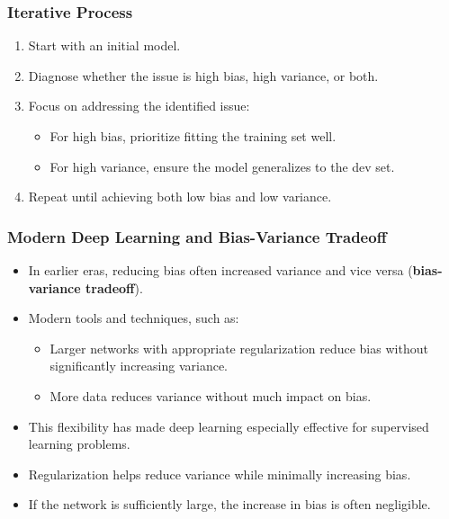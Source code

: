 \documentclass[letterpaper,12pt,notitlepage,twoside]{report}
\begin{document}
\subsubsection{Iterative Process}
\begin{enumerate}
    \item Start with an initial model.
    \item Diagnose whether the issue is high bias, high variance, or both.
    \item Focus on addressing the identified issue:
    \begin{itemize}
        \item For high bias, prioritize fitting the training set well.
        \item For high variance, ensure the model generalizes to the dev set.
    \end{itemize}
    \item Repeat until achieving both low bias and low variance.
\end{enumerate}

\subsubsection{Modern Deep Learning and Bias-Variance Tradeoff}
\begin{itemize}
    \item In earlier eras, reducing bias often increased variance and vice versa (\textbf{bias-variance tradeoff}).
    \item Modern tools and techniques, such as:
    \begin{itemize}
        \item Larger networks with appropriate regularization reduce bias without significantly increasing variance.
        \item More data reduces variance without much impact on bias.
    \end{itemize}
    \item This flexibility has made deep learning especially effective for supervised learning problems.
    \item Regularization helps reduce variance while minimally increasing bias.
    \item If the network is sufficiently large, the increase in bias is often negligible.
\end{itemize}
\end{document}
